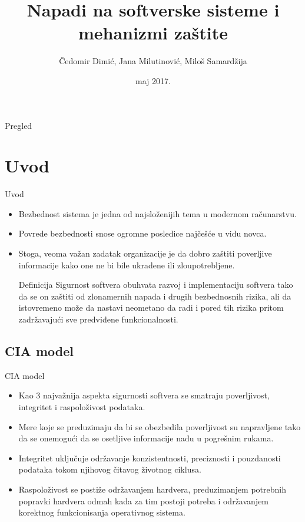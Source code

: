 \documentclass{beamer}
\title{Napadi na softverske sisteme i mehanizmi zaštite}
\author{Čedomir Dimić, Jana Milutinović, Miloš Samardžija}
\institute{Matematički fakultet} %
\date{maj 2017.}
\begin{document}
\begin{frame}
  \titlepage
\end{frame}

\begin{frame}{Pregled}
  \tableofcontents
\end{frame}

\section{Uvod}


\begin{frame}{Uvod}
  \begin{itemize}
  \item {
    Bezbednost sistema je jedna od najsloženijih tema u modernom računarstvu.
  }
  \pause
  \item {
    Povrede bezbednosti snose ogromne posledice najčešće u vidu novca. 
  }
  \pause
  \item {
    Stoga, veoma važan zadatak organizacije je da dobro zaštiti poverljive informacije kako one ne bi bile ukradene ili zloupotrebljene.
  }
  \pause
    \begin{block}{Definicija}
      Sigurnost softvera obuhvata razvoj i implementaciju softvera tako da se on zaštiti od zlonamernih napada i drugih bezbednosnih rizika, ali da istovremeno može da nastavi neometano da radi i pored tih rizika pritom zadržavajući sve predviđene funkcionalnosti.
    \end{block}
  \end{itemize}
\end{frame}

\subsection{CIA model}

\begin{frame}{CIA model}
  \begin{itemize}
  \item {
    Kao 3 najvažnija aspekta sigurnosti softvera se smatraju poverljivost, integritet i raspoloživost podataka.
    \pause
  }
   \item {
    Mere koje se preduzimaju da bi se obezbedila poverljivost su napravljene tako da se onemogući da se osetljive informacije nađu u pogrešnim rukama.
    \pause
  }
  \item {   
    Integritet uključuje održavanje konzistentnosti, preciznosti i pouzdanosti podataka tokom njihovog čitavog životnog ciklusa.
    \pause
  }
  \item {   
    Raspoloživost se postiže održavanjem hardvera, preduzimanjem potrebnih popravki hardvera odmah kada za tim postoji potreba i održavanjem korektnog funkcionisanja operativnog sistema.
  }
  \end{itemize}
\end{frame}
\end{document}
